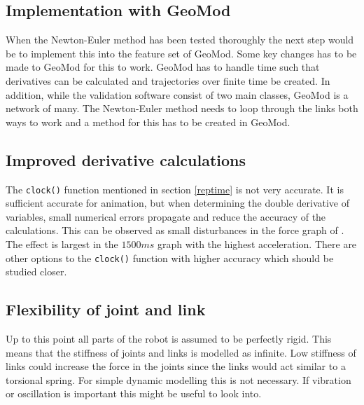 \subsection{Implementation with GeoMod}
When the Newton-Euler method has been tested thoroughly the next step would be to implement this into the feature set of GeoMod. Some key changes has to be made to GeoMod for this to work. GeoMod has to handle time such that derivatives can be calculated and trajectories over finite time be created. In addition, while the validation software consist of two main classes, GeoMod is a network of many. The Newton-Euler method needs to loop through the links both ways to work and a method for this has to be created in GeoMod.

\subsection{Improved derivative calculations}

The \texttt{clock()} function mentioned in section \ref{reptime} is not very accurate. It is sufficient accurate for animation, but when determining the double derivative of variables, small numerical errors propagate and reduce the accuracy of the calculations. This can be observed as small disturbances in the force graph of . The effect is largest in the $1500ms$ graph with the highest acceleration. There are other options to the \texttt{clock()} function with higher accuracy which should be studied closer.

\subsection{Flexibility of joint and link}

Up to this point all parts of the robot is assumed to be perfectly rigid. This means that the stiffness of joints and links is modelled as infinite. Low stiffness of links could increase the force in the joints since the links would act similar to a torsional spring. For simple dynamic modelling this is not necessary. If vibration or oscillation is important this might be useful to look into.

\vspace{-1cm}
